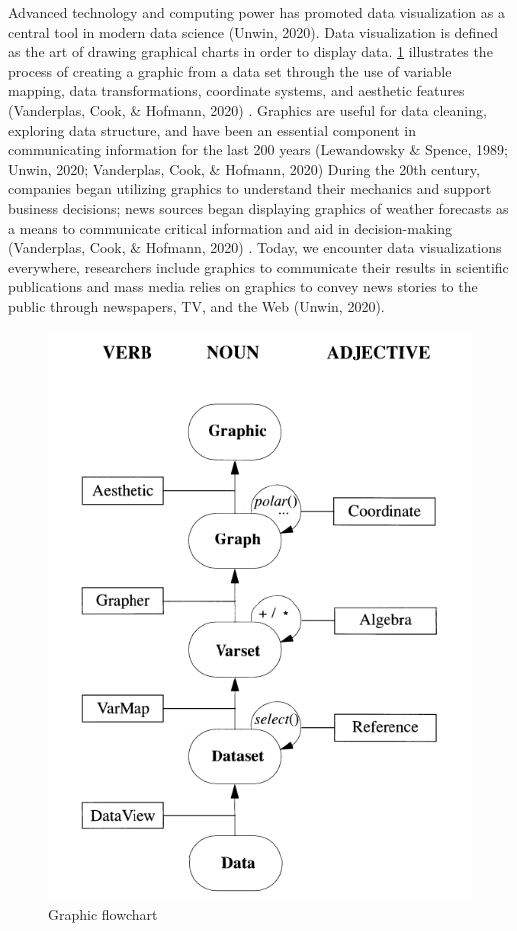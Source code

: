 \documentclass[print]{nuthesis}
\begin{document}
Advanced technology and computing power has promoted data visualization as a central tool in modern data science (Unwin, 2020).
Data visualization is defined  as the art of drawing graphical charts in order to display data.
\cref{fig:graphic-flowchart} illustrates the process of creating a graphic from a data set through the use of variable mapping, data transformations, coordinate systems, and aesthetic features (Vanderplas, Cook, \& Hofmann, 2020) .
 Graphics are useful for data cleaning, exploring data structure, and have been an essential component in communicating information for the last 200 years (Lewandowsky \& Spence, 1989; Unwin, 2020; Vanderplas, Cook, \& Hofmann, 2020)
During the 20th century, companies began utilizing graphics to understand their mechanics and support business decisions; news sources began displaying graphics of weather forecasts as a means to communicate critical information and aid in decision-making (Vanderplas, Cook, \& Hofmann, 2020) .
Today, we encounter data visualizations everywhere, researchers include graphics to communicate their results in scientific publications and mass media relies on graphics to convey news stories to the public through newspapers, TV, and the Web (Unwin, 2020).

\begin{figure}[tbp]

{\centering \includegraphics[width=0.5\linewidth,]{images/graphic-flowchart} 

}

\caption{Graphic flowchart}\label{fig:graphic-flowchart}
\end{figure}
\end{document}
